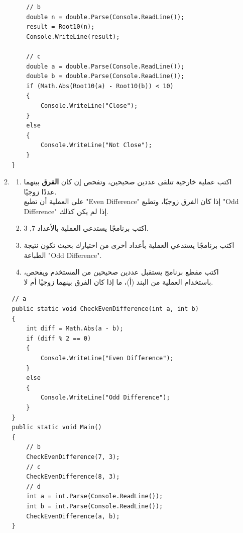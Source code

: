 ﻿\documentclass[12pt]{article}
\begin{document}
\begin{enumerate}[itemsep=3em]
\begin{enumerate}
\begin{boxSolution}
\begin{english}
\begin{verbatim}
    // b
    double n = double.Parse(Console.ReadLine());
    result = Root10(n);
    Console.WriteLine(result);

    // c
    double a = double.Parse(Console.ReadLine());
    double b = double.Parse(Console.ReadLine());
    if (Math.Abs(Root10(a) - Root10(b)) < 10)
    {
        Console.WriteLine("Close");
    }
    else
    {
        Console.WriteLine("Not Close");
    }
}
\end{verbatim}
\end{english}
\end{boxSolution}
\clearpage
\fi

\item
\begin{enumerate}
\item اكتب عملية خارجية تتلقى عددين صحيحين، وتفحص إن كان \textbf{الفرق} بينهما عددًا زوجيًا. \\
على العملية أن تطبع \textenglish{"Even Difference"} إذا كان الفرق زوجيًا،
وتطبع \textenglish{"Odd Difference"} إذا لم يكن كذلك.
\item اكتب برنامجًا يستدعي العملية بالأعداد \textenglish{7, 3}.
\item اكتب برنامجًا يستدعي العملية بأعداد أخرى من اختيارك بحيث تكون نتيجة الطباعة \textenglish{"Odd Difference"}.
\item اكتب مقطع برنامج يستقبل عددين صحيحين من المستخدم ويفحص، باستخدام العملية من البند (أ)، ما إذا كان الفرق بينهما زوجيًا أم لا.
\end{enumerate}

\ifwithsols
\begin{boxSolution}
\begin{english}
\begin{verbatim}
// a
public static void CheckEvenDifference(int a, int b)
{
    int diff = Math.Abs(a - b);
    if (diff % 2 == 0)
    {
        Console.WriteLine("Even Difference");
    }
    else
    {
        Console.WriteLine("Odd Difference");
    }
}
public static void Main()
{
    // b
    CheckEvenDifference(7, 3);
    // c
    CheckEvenDifference(8, 3);
    // d
    int a = int.Parse(Console.ReadLine());
    int b = int.Parse(Console.ReadLine());
    CheckEvenDifference(a, b);
}
\end{verbatim}
\end{english}
\end{boxSolution}
\fi


\end{enumerate}
\end{enumerate}
\end{document}
